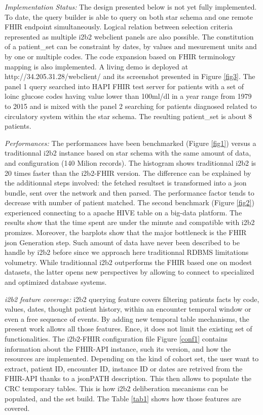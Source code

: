 \documentclass{amia}
\begin{document}
\textit{Implementation Status: } The design presented below is not yet fully implemented. To date, the query builder is able to query on both star schema and one remote FHIR endpoint simultaneously. Logical relation between selection criteria represented as multiple i2b2 webclient panels are also possible. The constitution of a patient\_set can be constraint by dates, by values and mesurement units and by one or multiple codes. The code expansion based on FHIR terminology mapping is also implemented. A living demo is deployed at http://34.205.31.28/webclient/ and its screenshot presented in Figure \ref{fig3}. The panel 1 query searched into HAPI FHIR test server for patients with a set of loinc glucose codes having value lower than 100ml/dl in a year range from 1979 to 2015 and is mixed with the panel 2 searching for patients diagnosed related to circulatory system within the star schema. The resulting patient\_set is about 8 patients.

\textit{Performances: } The performances have been benchmarked (Figure \ref{fig1}) versus a traditionnal i2b2 instance based on star schema with the same amount of data, and configuration (140 Milion records). The histogram shows traditionnal i2b2 is 20 times faster than the i2b2-FHIR version. The difference can be explained by the additionnal steps involved: the fetched resultset is transformed into a json bundle, sent over the network and then parsed. The performance factor tends to decrease with number of patient matched. The second benchmark (Figure \ref{fig2}) experienced connecting to a apache HIVE table on a big-data platform. The results show that the time spent are under the minute and compatible with i2b2 promizes. Moreover, the barplots show that the major bottleneck is the FHIR json Generation step. Such amount of data have never been described to be handle by i2b2 before since we approach here traditionnal RDBMS limitations volumetry. While traditionnal i2b2 outperforms the FHIR based one on modest datasets, the latter opens new perspectives by allowing to connect to specialized and optimized database systems.


\textit{i2b2 feature coverage: }i2b2 querying feature covers filtering patients facts by code, values, dates, thought patient history, within an encounter temporal window or even a free sequence of events. By adding new temporal table mechanisms, the present work allows all those features. Ence, it does not limit the existing set of functionalities. The i2b2-FHIR configuration file Figure \ref{conf1} contains information about the FHIR-API instance, such its version, and how the resources are implemented. Depending on the kind of cohort set, the user want to extract, patient ID, encounter ID, instance ID or dates are retrived from the FHIR-API thanks to a jsonPATH description. This then allows to populate the CRC temporary tables. This is how i2b2 deliberation mecanisms can be populated, and the set build. The Table \ref{tab1} shows how those features are covered.
\end{document}
